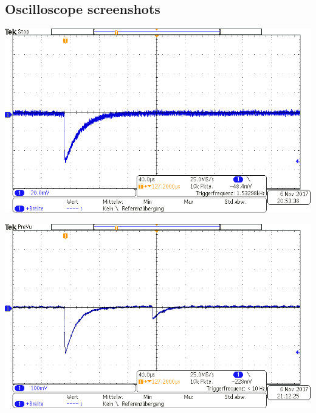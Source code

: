 \subsection{Oscilloscope screenshots}
%
\begin{multicols}{2}
%
\minipage{\linewidth}
    \begin{center}
        \captionsetup{type=figure}
        \begin{adjustbox}{max width=\linewidth, keepaspectratio}
            \includegraphics[]{png/tek00000}
        \end{adjustbox}
        \label{fig:OsciSignal1}
    \end{center}
\endminipage
%
\vspace{10mm}
%
\minipage{\linewidth}
    \begin{center}
        \captionsetup{type=figure}
        \begin{adjustbox}{max width=\linewidth, keepaspectratio}
            \includegraphics[]{png/tek00001}
        \end{adjustbox}

\end{center}
\end{multicols}
